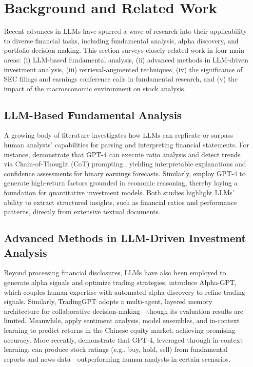 \section{Background and Related Work}
\label{sec:2}

Recent advances in LLMs have spurred a wave of research into their applicability to diverse financial tasks, including fundamental analysis, alpha discovery, and portfolio decision-making. This section surveys closely related work in four main areas: (i) LLM-based fundamental analysis, (ii) advanced methods in LLM-driven investment analysis, (iii) retrieval-augmented techniques, (iv) the significance of SEC filings and earnings conference calls in fundamental research, and (v) the impact of the macroeconomic environment on stock analysis.

\subsection{LLM-Based Fundamental Analysis}
A growing body of literature investigates how LLMs can replicate or surpass human analysts’ capabilities for parsing and interpreting financial statements. For instance, \cite{kim2024financial} demonstrate that GPT-4 can execute ratio analysis and detect trends via Chain-of-Thought (CoT) prompting \cite{wei2022chain}, yielding interpretable explanations and confidence assessments for binary earnings forecasts. Similarly, \cite{cheng2024gpt} employ GPT-4 to generate high-return factors grounded in economic reasoning, thereby laying a foundation for quantitative investment models. Both studies highlight LLMs’ ability to extract structured insights, such as financial ratios and performance patterns, directly from extensive textual documents.

\subsection{Advanced Methods in LLM-Driven Investment Analysis}
Beyond processing financial disclosures, LLMs have also been employed to generate alpha signals and optimize trading strategies. \cite{wang2023alpha} introduce Alpha-GPT, which couples human expertise with automated alpha discovery to refine trading signals. Similarly, TradingGPT \cite{li2023tradinggpt} adopts a multi-agent, layered memory architecture for collaborative decision-making—though its evaluation results are limited. Meanwhile, \cite{tan2023large} apply sentiment analysis, model ensembles, and in-context learning to predict returns in the Chinese equity market, achieving promising accuracy. More recently, \cite{papasotiriou2024ai} demonstrate that GPT-4, leveraged through in-context learning, can produce stock ratings (e.g., buy, hold, sell) from fundamental reports and news data—outperforming human analysts in certain scenarios.

